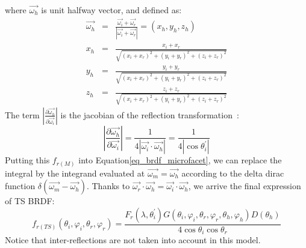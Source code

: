 where $\overrightarrow{\omega_h}$ is unit halfway vector, and defined as:
\begin{equation}
    \label{eq_half-vector}
    \begin{array}{lll}
        \overrightarrow{\omega_h} & = & \frac{\overrightarrow{\omega_i} + \overrightarrow{\omega_r}}{\left|\overrightarrow{\omega_i} + \overrightarrow{\omega_r}\right|} = (x_h, y_h, z_h) \\
        x_h                       & = & \frac{x_i + x_r}{\sqrt{(x_i + x_r)^2 + (y_i + y_r)^2 + (z_i + z_r)^2}}                                                                             \\
        y_h                       & = & \frac{y_i + y_r}{\sqrt{(x_i + x_r)^2 + (y_i + y_r)^2 + (z_i + z_r)^2}}                                                                             \\
        z_h                       & = & \frac{z_i + z_r}{\sqrt{(x_i + x_r)^2 + (y_i + y_r)^2 + (z_i + z_r)^2}}
    \end{array}
\end{equation}
The term $\left|\frac{\partial \overrightarrow{\omega_h}}{\partial \overrightarrow{\omega_i}} \right|$ is the jacobian of the reflection transformation~\cite{2007_Walter, 2014_Heitz}:
\[
    \left|\frac{\partial \overrightarrow{\omega_h}}{\partial \overrightarrow{\omega_i}} \right|
    = \frac{1}{4\left|\overrightarrow{\omega_i} \cdot \overrightarrow{\omega_h}\right|}%
    = \frac{1}{4\left|\cos\theta_i^\prime\right|}
\]
Putting this $f_{r(M)}$ into Equation\eqref{eq_brdf_microfacet}, we can replace the integral by the integrand evaluated at $\overrightarrow{\omega_m} = \overrightarrow{\omega_h}$ according to the delta dirac function $\delta(\overrightarrow{\omega_m} - \overrightarrow{\omega_h})$.
Thanks to $\overrightarrow{\omega_r}\cdot \overrightarrow{\omega_h} = \overrightarrow{\omega_i}\cdot \overrightarrow{\omega_h}$, we arrive the final expression of TS BRDF:
\begin{equation}
    \label{eq_brdf_TS}
    f_{r(TS)}(\theta_i, \varphi_i, \theta_r, \varphi_r) = \frac{F_r(\lambda, \theta_i^\prime)%
        G(\theta_i, \varphi_i, \theta_r, \varphi_r,\theta_h, \varphi_h)%
        D(\theta_h)}%
    {4 \cos\theta_i \cos\theta_r}
\end{equation}
Notice that inter-reflections are not taken into account in this model.


